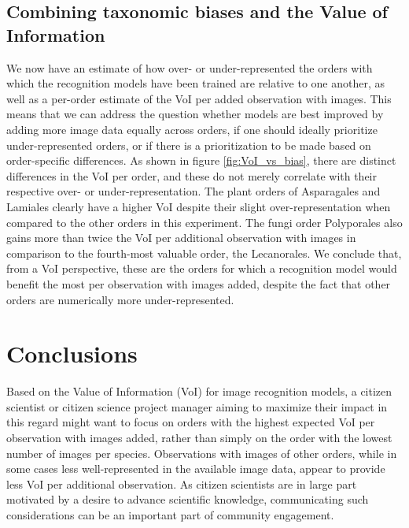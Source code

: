 \documentclass{article}
\begin{document}
\subsection*{Combining taxonomic biases and the Value of Information}
We now have an estimate of how over- or under-represented the orders with which the recognition models have been trained are relative to one another, as well as a per-order estimate of the VoI per added observation with images. This means that we can address the question whether models are best improved by adding more image data equally across orders, if one should ideally prioritize under-represented orders, or if there is a prioritization to be made based on order-specific differences. As shown in figure \ref{fig:VoI_vs_bias}, there are distinct differences in the VoI per order, and these do not merely correlate with their respective over- or under-representation. The plant orders of Asparagales and Lamiales clearly have a higher VoI despite their slight over-representation when compared to the other orders in this experiment. The fungi order Polyporales also gains more than twice the VoI per additional observation with images in comparison to the fourth-most valuable order, the Lecanorales. We conclude that, from a VoI perspective, these are the orders for which a recognition model would benefit the most per observation with images added, despite the fact that other orders are numerically more under-represented.

\section*{Conclusions}
Based on the Value of Information (VoI) for image recognition models, a citizen scientist or citizen science project manager aiming to maximize their impact in this regard might want to focus on orders with the highest expected VoI per observation with images added, rather than simply on the order with the lowest number of images per species. Observations with images of other orders, while in some cases less well-represented in the available image data, appear to provide less VoI per additional observation. As citizen scientists are in large part motivated by a desire to advance scientific knowledge\autocite{Richter2021}, communicating such considerations can be an important part of community engagement.
\end{document}

